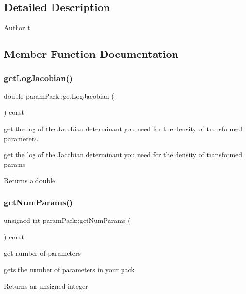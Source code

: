 \subsection{Detailed Description}
\begin{DoxyAuthor}{Author}
t 
\end{DoxyAuthor}


\subsection{Member Function Documentation}
\mbox{\label{classparamPack_adb44adbc09eb281022984461fc2050f2}} 
\subsubsection{\texorpdfstring{get\+Log\+Jacobian()}{getLogJacobian()}}
{\footnotesize\ttfamily double param\+Pack\+::get\+Log\+Jacobian (\begin{DoxyParamCaption}{ }\end{DoxyParamCaption}) const}



get the log of the Jacobian determinant you need for the density of transformed parameters. 

get the log of the Jacobian determinant you need for the density of transformed params \begin{DoxyReturn}{Returns}
a double 
\end{DoxyReturn}
\mbox{\label{classparamPack_a69fc36c50f73e6b827d2e339e2e8b806}} 
\subsubsection{\texorpdfstring{get\+Num\+Params()}{getNumParams()}}
{\footnotesize\ttfamily unsigned int param\+Pack\+::get\+Num\+Params (\begin{DoxyParamCaption}{ }\end{DoxyParamCaption}) const}



get number of parameters 

gets the number of parameters in your pack \begin{DoxyReturn}{Returns}
an unsigned integer 
\end{DoxyReturn}
\mbox{\label{classparamPack_a384545f4e43c572c236b2535514830e3}} 
